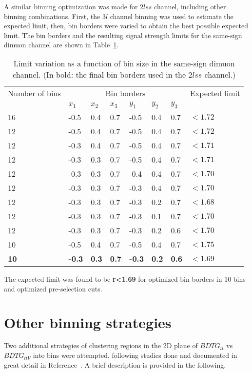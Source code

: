 A similar binning optimization was made for $2lss$ channel, including other binning combinations. First, the $3l$ channel binning was used to estimate the expected limit, then, bin borders were varied to obtain the best possible expected limit. The bin borders and the resulting signal strength limits for the same-sign dimuon channel are shown in Table~\ref{bin_limits_2lss}.

\begin{table}[h!]
\centering
\begin{tabular}{llllllll}\hline
Number of bins  & \multicolumn{6}{c}{Bin borders}  & Expected limit \\
                &$x_1$&$x_2$&$x_3$&$y_1$&$y_2$&$y_3$&\\\hline
16              &-0.5 & 0.4 & 0.7 &-0.5 & 0.4 & 0.7 & $<1.72$\\
12              &-0.5 & 0.4 & 0.7 &-0.5 & 0.4 & 0.7 & $<1.72$\\
12              &-0.3 & 0.4 & 0.7 &-0.5 & 0.4 & 0.7 & $<1.71$\\
12              &-0.3 & 0.3 & 0.7 &-0.5 & 0.4 & 0.7 & $<1.71$\\
12              &-0.3 & 0.3 & 0.7 &-0.4 & 0.4 & 0.7 & $<1.70$\\
12              &-0.3 & 0.3 & 0.7 &-0.3 & 0.4 & 0.7 & $<1.70$\\
12              &-0.3 & 0.3 & 0.7 &-0.3 & 0.2 & 0.7 & $<1.68$\\
12              &-0.3 & 0.3 & 0.7 &-0.3 & 0.1 & 0.7 & $<1.70$\\
12              &-0.3 & 0.3 & 0.7 &-0.3 & 0.2 & 0.6 & $<1.70$\\
10              &-0.5 & 0.4 & 0.7 &-0.5 & 0.4 & 0.7 & $<1.75$\\
\textbf{10}     &\textbf{-0.3} &\textbf{ 0.3} &\textbf{ 0.7} &\textbf{-0.3} &\textbf{ 0.2} &\textbf{ 0.6} &$\mathbf{<1.69}$\\\hline
\end{tabular}
\caption[Limit variation as a function of bin size, $2lss$ channel.]{Limit variation as a function of bin size in the same-sign dimuon channel. (In bold: the final bin borders used in the $2lss$ channel.)}
\label{bin_limits_2lss}
\end{table}

The expected limit was found to be \textbf{r<1.69} for optimized bin borders in 10 bins and optimized pre-selection cuts.

\section{Other binning strategies}
Two additional strategies of clustering regions in the 2D plane of $BDTG_{tt}$ vs $BDTG_{ttV}$ into bins were attempted, following studies done and documented in great detail in Reference~\cite{CMS_AN_2017-029}. A brief description is provided in the following.

